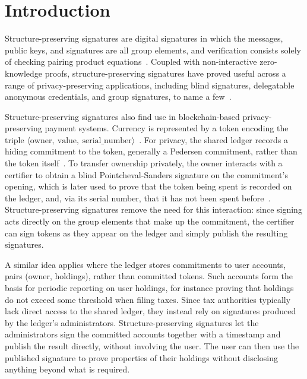 \section{Introduction}\label{sec:tsps-introduction}

Structure-preserving signatures are digital signatures in which the messages,
public keys, and signatures are all group elements, and verification
consists solely of checking pairing product
equations~\cite{C:AFGHO10,C:AGHO11,TCC:AGOT14,C:KilPanWee15,AC:Groth15,RSA:Ghadafi16}.
Coupled with non-interactive zero-knowledge proofs, structure-preserving
signatures have proved useful across a range of privacy-preserving
applications, including blind signatures, delegatable anonymous credentials,
and group signatures, to name a
few~\cite{AFRICACRYPT:FucVer10,CCS:CamDriDub17,RSA:CriLys19,PoPETS:MSBM23,AC:Groth06,AC:Groth07,C:LibPetYun15}.

Structure-preserving signatures also find use in blockchain-based
privacy-preserving payment systems. Currency is represented by a token
encoding the triple $\langle \text{owner}, \ \text{value}, \
\text{serial\_number} \rangle$~\cite{EPRINT:ACDDET19,EPRINT:TBAAGP22,CCS:KiaKohSar22}.
For privacy, the shared ledger records a hiding commitment to the token,
generally a Pedersen commitment, rather than the token
itself~\cite{C:Pedersen91}. To transfer ownership privately, the owner
interacts with a certifier to obtain a blind Pointcheval-Sanders signature on
the commitment's opening, which is later used to prove that the token being
spent is recorded on the ledger, and, via its serial number, that it has not
been spent before~\cite{RSA:PoiSan16,RSA:PoiSan18,NDSS:SABMD19}.
Structure-preserving signatures remove the need for this interaction: since
signing acts directly on the group elements that make up the commitment, the
certifier can sign tokens as they appear on the ledger and simply publish the
resulting signatures.

A similar idea applies where the ledger stores commitments to user accounts,
pairs (owner, holdings), rather than committed
tokens. Such accounts form the basis for periodic reporting on user holdings,
for instance proving that holdings do not exceed some threshold when filing
taxes. Since tax authorities typically lack direct access to the shared
ledger, they instead rely on signatures produced by the ledger's
administrators. Structure-preserving signatures let the administrators sign
the committed accounts together with a timestamp and publish the result
directly, without involving the user. The user can then use the published
signature to prove properties of their holdings without disclosing anything
beyond what is required.

